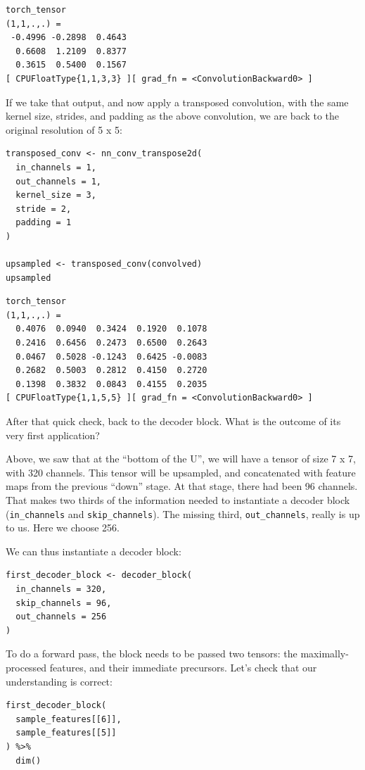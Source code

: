 \documentclass[
  letterpaper,
]{krantz}
\begin{document}
\begin{verbatim}
torch_tensor
(1,1,.,.) = 
 -0.4996 -0.2898  0.4643
  0.6608  1.2109  0.8377
  0.3615  0.5400  0.1567
[ CPUFloatType{1,1,3,3} ][ grad_fn = <ConvolutionBackward0> ]
\end{verbatim}

If we take that output, and now apply a transposed convolution, with the
same kernel size, strides, and padding as the above convolution, we are
back to the original resolution of 5 x 5:

\begin{verbatim}
transposed_conv <- nn_conv_transpose2d(
  in_channels = 1,
  out_channels = 1,
  kernel_size = 3,
  stride = 2,
  padding = 1
)

upsampled <- transposed_conv(convolved)
upsampled
\end{verbatim}

\begin{verbatim}
torch_tensor
(1,1,.,.) = 
  0.4076  0.0940  0.3424  0.1920  0.1078
  0.2416  0.6456  0.2473  0.6500  0.2643
  0.0467  0.5028 -0.1243  0.6425 -0.0083
  0.2682  0.5003  0.2812  0.4150  0.2720
  0.1398  0.3832  0.0843  0.4155  0.2035
[ CPUFloatType{1,1,5,5} ][ grad_fn = <ConvolutionBackward0> ]
\end{verbatim}

After that quick check, back to the decoder block. What is the outcome
of its very first application?

Above, we saw that at the ``bottom of the U'', we will have a tensor of
size 7 x 7, with 320 channels. This tensor will be upsampled, and
concatenated with feature maps from the previous ``down'' stage. At that
stage, there had been 96 channels. That makes two thirds of the
information needed to instantiate a decoder block (\texttt{in\_channels}
and \texttt{skip\_channels}). The missing third, \texttt{out\_channels},
really is up to us. Here we choose 256.

We can thus instantiate a decoder block:

\begin{verbatim}
first_decoder_block <- decoder_block(
  in_channels = 320,
  skip_channels = 96,
  out_channels = 256
)
\end{verbatim}

To do a forward pass, the block needs to be passed two tensors: the
maximally-processed features, and their immediate precursors. Let's
check that our understanding is correct:

\begin{verbatim}
first_decoder_block(
  sample_features[[6]],
  sample_features[[5]]
) %>%
  dim()
\end{verbatim}
\end{document}
